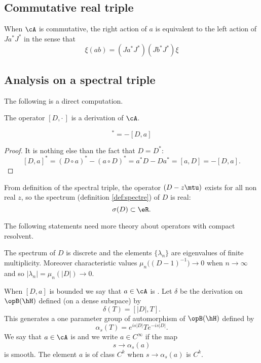 \subsection{Commutative real triple}

When $\cA$ is commutative, the right action of $a$ is equivalent to the left action of $Ja^*J^*$ in the sense that
\[ 
  \xi(ab)=(Ja^*J^*)(Jb^*J^*)\xi
\]

\subsection{Analysis on a spectral triple}

The following is a direct computation.
\begin{lemma}
The operator $[D,\cdot\,]$ is a derivation of $\cA$.
\end{lemma}

\begin{lemma}
\begin{equation}
  [D,a]^*=-[D,a]
\end{equation}

\end{lemma}
\begin{proof}
It is nothing else than the fact that $D=D^*$:
\[ 
  [D,a]^*=(D\circ a)^*-(a\circ D)^*=a^*D-Da^*=[a,D]=-[D,a].
\]

\end{proof}

From definition of the spectral triple, the operator $(D-z\mtu)$ exists for all non real $z$, so the spectrum (definition \ref{def:spectre}) of $D$ is real:
\[ 
  \sigma(D)\subset \eR.
\]

\begin{probleme}
	The following statements need more theory about operators with compact resolvent.
\end{probleme}

The spectrum of $D$ is discrete and the elements $\{ \lambda_n \}$ are eigenvalues of finite multiplicity. Moreover characteristic values $\mu_n\big( (D-1)^{-1} \big)\to 0$ when $n\to\infty$ and so $| \lambda_n |=\mu_n(| D |)\to0$.

When $[D,a]$ is bounded we say that $a\in\cA$ is . Let $\delta$ be the derivation on $\opB(\hH)$ defined (on a dense subspace) by
\[ 
  \delta(T)=[| D |,T].
\]
This generates a one parameter group of automorphism of $\opB(\hH)$ defined by
\begin{equation}
\alpha_s(T)= e^{is| D |}T e^{-is| D |}.
\end{equation}
We say that $a\in\cA$ is  and we write $a\in C^{\infty}$ if the map 
\[ 
  s\to\alpha_s(a)
\]
is smooth. The element $a$ is of class $C^k$ when $s\to\alpha_s(a)$ is $C^k$.

